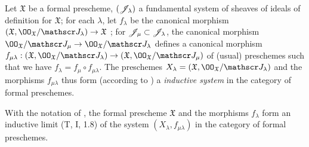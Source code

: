 \begin{env}[10.6.1]
\label{1.10.6.1}
Let $\mathfrak{X}$ be a formal prescheme, $(\mathscr{J}_\lambda)$ a fundamental system of sheaves of ideals of definition for $\mathfrak{X}$; for each $\lambda$, let $f_\lambda$ be the canonical morphism $(\mathfrak{X},\OO_\mathfrak{X}/\sh{J}_\lambda)\to\mathfrak{X}$ ; for $\mathscr{J}_\mu\subset\mathscr{J}_\lambda$, the canonical morphism $\OO_\mathfrak{X}/\sh{J}_\mu\to\OO_\mathfrak{X}/\sh{J}_\lambda$ defines a canonical morphism
$f_{\mu\lambda}:(\mathfrak{X},\OO_\mathfrak{X}/\sh{J}_\lambda)\to(\mathfrak{X},\OO_\mathfrak{X}/\sh{J}_\mu)$ of (usual) preschemes such that we have $f_\lambda=f_\mu\circ f_{\mu\lambda}$.
The preschemes $X_\lambda=(\mathfrak{X},\OO_\mathfrak{X}/\sh{J}_\lambda)$ and the morphisms $f_{\mu\lambda}$ thus form (according to ) a \emph{inductive system} in the category of formal preschemes.
\end{env}

\begin{prop}[10.6.2]
\label{1.10.6.2}
With the notation of , the formal prescheme $\mathfrak{X}$ and the morphisms $f_\lambda$ form an inductive limit (T, I, 1.8) of the system $(X_\lambda,f_{\mu\lambda})$ in the category of formal preschemes.
\end{prop}

